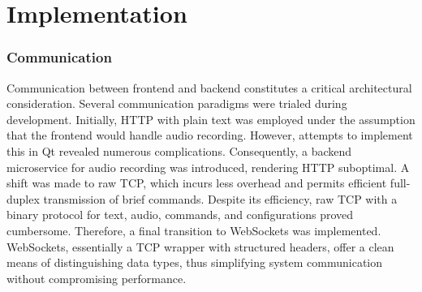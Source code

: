 \cleardoubleemptypage
\renewcommand*\chapterpagestyle{scrheadings}

\chapter{Implementation}

\subsection{Communication}
Communication between frontend and backend constitutes a critical architectural consideration.
Several communication paradigms were trialed during development.
Initially, HTTP with plain text was employed under the assumption that the frontend would handle audio recording.
However, attempts to implement this in Qt revealed numerous complications.
Consequently, a backend microservice for audio recording was introduced, rendering HTTP suboptimal.
A shift was made to raw TCP, which incurs less overhead and permits efficient full-duplex transmission of brief commands.
Despite its efficiency, raw TCP with a binary protocol for text, audio, commands, and configurations proved cumbersome.
Therefore, a final transition to WebSockets was implemented.
WebSockets, essentially a TCP wrapper with structured headers, offer a clean means of distinguishing data types,
thus simplifying system communication without compromising performance.

